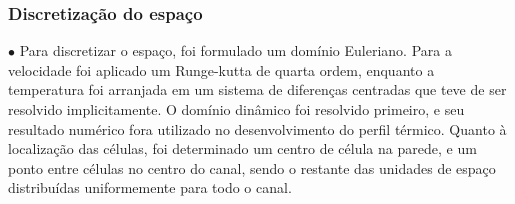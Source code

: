 \documentclass[xcolor=dvipsnames,10pt,aspectratio=169]{beamer}
\begin{document}
		\begin{frame}
			\frametitle{Discretização do espaço}
			\begin{minipage}[h!]{0.5\textwidth}
			$\bullet$ Para discretizar o espaço, foi formulado um domínio Euleriano. Para a velocidade foi aplicado um Runge-kutta de quarta ordem, enquanto a temperatura foi arranjada em um sistema de diferenças centradas que teve de ser resolvido implicitamente. O domínio dinâmico foi resolvido primeiro, e seu resultado numérico fora utilizado no desenvolvimento do perfil térmico. Quanto à localização das células, foi determinado um centro de célula na parede, e um ponto entre células no centro do canal, sendo o restante das unidades de espaço distribuídas uniformemente para todo o canal.
			\end{minipage}\hfill
			\begin{minipage}[h!]{0.45\textwidth}
			\begin{figure}
				\centering

\end{figure}
\end{minipage}
\end{frame}
\end{document}
